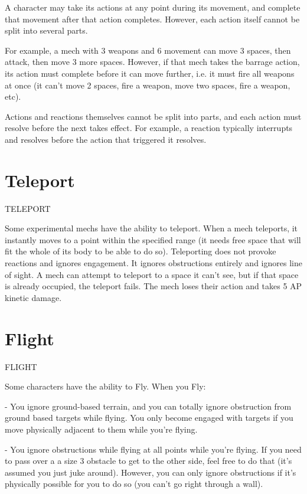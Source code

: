 A character may take its actions at any point during its movement, and complete that movement
after that action completes. However, each action itself cannot be split into several parts.

For example, a mech with 3 weapons and 6 movement can move 3 spaces, then attack, then
move 3 more spaces. However, if that mech takes the barrage action, its action must complete
before it can move further, i.e. it must fire all weapons at once (it can’t move 2 spaces, fire a
weapon, move two spaces, fire a weapon, etc).

Actions and reactions themselves cannot be split into parts, and each action must resolve before
the next takes effect. For example, a reaction typically interrupts and resolves before the action
that triggered it resolves.

\section{Teleport}
                                                TELEPORT

Some experimental mechs have the ability to teleport. When a mech teleports, it instantly moves
to a point within the specified range (it needs free space that will fit the whole of its body to be
able to do so). Teleporting does not provoke reactions and ignores engagement. It ignores
obstructions entirely and ignores line of sight. A mech can attempt to teleport to a space it can’t
see, but if that space is already occupied, the teleport fails. The mech loses their action and takes
5 AP kinetic damage.

\section{Flight}
                                                   FLIGHT

Some characters have the ability to Fly. When you Fly:




    -    You ignore ground-based terrain, and you can totally ignore obstruction from ground
         based targets while flying. You only become engaged with targets if you move physically
         adjacent to them while you’re flying.

    -    You ignore obstructions while flying at all points while you’re flying. If you need to pass
         over a a size 3 obstacle to get to the other side, feel free to do that (it’s assumed you just
         juke around). However, you can only ignore obstructions if it’s physically possible for you
         to do so (you can’t go right through a wall).

